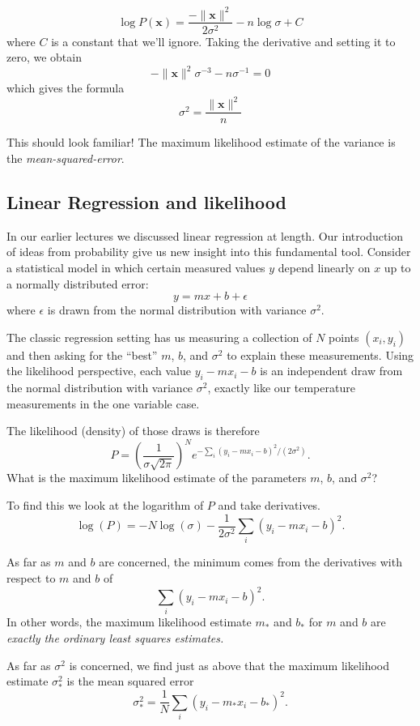 \documentclass[
  11pt,
  letterpaper,
]{scrbook}
\theoremstyle{plain}
\theoremstyle{plain}
\theoremstyle{remark}
\begin{document}
\[
\log P(\mathbf{x})=\frac{-\|\mathbf{x}\|^2}{2\sigma^2}-n\log{\sigma}+C
\] where \(C\) is a constant that we'll ignore. Taking the derivative
and setting it to zero, we obtain \[
-\|\mathbf{x}\|^2\sigma^{-3}-n\sigma^{-1}=0
\] which gives the formula \[
\sigma^2=\frac{\|\mathbf{x}\|^2}{n}
\]

This should look familiar! The maximum likelihood estimate of the
variance is the \emph{mean-squared-error}.

\hypertarget{sec-LRLike}{%
\subsection{Linear Regression and likelihood}\label{sec-LRLike}}

In our earlier lectures we discussed linear regression at length. Our
introduction of ideas from probability give us new insight into this
fundamental tool. Consider a statistical model in which certain measured
values \(y\) depend linearly on \(x\) up to a normally distributed
error: \[
y=mx+b+\epsilon
\] where \(\epsilon\) is drawn from the normal distribution with
variance \(\sigma^2\).

The classic regression setting has us measuring a collection of \(N\)
points \((x_i,y_i)\) and then asking for the ``best'' \(m\), \(b\), and
\(\sigma^2\) to explain these measurements. Using the likelihood
perspective, each value \(y_i-mx_i-b\) is an independent draw from the
normal distribution with variance \(\sigma^2\), exactly like our
temperature measurements in the one variable case.

The likelihood (density) of those draws is therefore \[
P = \left(\frac{1}{\sigma\sqrt{2\pi}}\right)^Ne^{-\sum_{i}(y_i-mx_i-b)^2/(2\sigma^2)}.
\] What is the maximum likelihood estimate of the parameters \(m\),
\(b\), and \(\sigma^2\)?

To find this we look at the logarithm of \(P\) and take derivatives. \[
\log(P) = -N\log(\sigma) -\frac{1}{2\sigma^2}\sum_{i}(y_i-mx_i-b)^2.
\]

As far as \(m\) and \(b\) are concerned, the minimum comes from the
derivatives with respect to \(m\) and \(b\) of \[
\sum_{i}(y_i-mx_i-b)^2.
\] In other words, the maximum likelihood estimate \(m_*\) and \(b_*\)
for \(m\) and \(b\) are \emph{exactly the ordinary least squares
estimates.}

As far as \(\sigma^2\) is concerned, we find just as above that the
maximum likelihood estimate \(\sigma^2_*\) is the mean squared error \[
\sigma^2_*=\frac{1}{N}\sum_{i}(y_i-m_*x_i-b_*)^2.
\]
\end{document}
